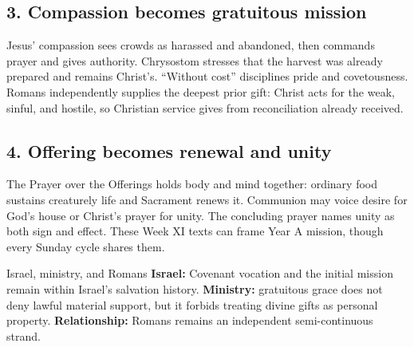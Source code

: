 \subsection*{3. Compassion becomes gratuitous mission\enspace{}}

Jesus' compassion sees crowds as harassed and abandoned, then commands prayer and gives authority. Chrysostom stresses that the harvest was already prepared and remains Christ's. “Without cost” disciplines pride and covetousness. Romans independently supplies the deepest prior gift: Christ acts for the weak, sinful, and hostile, so Christian service gives from reconciliation already received.

\subsection*{4. Offering becomes renewal and unity\enspace{}}

The Prayer over the Offerings holds body and mind together: ordinary food sustains creaturely life and Sacrament renews it. Communion may voice desire for God's house or Christ's prayer for unity. The concluding prayer names unity as both sign and effect. These Week XI texts can frame Year A mission, though every Sunday cycle shares them.

\begin{studybox}{Israel, ministry, and Romans}
\textbf{Israel:} Covenant vocation and the initial mission remain within Israel's salvation history. \textbf{Ministry:} gratuitous grace does not deny lawful material support, but it forbids treating divine gifts as personal property. \textbf{Relationship:} Romans remains an independent semi-continuous strand.
\end{studybox}
